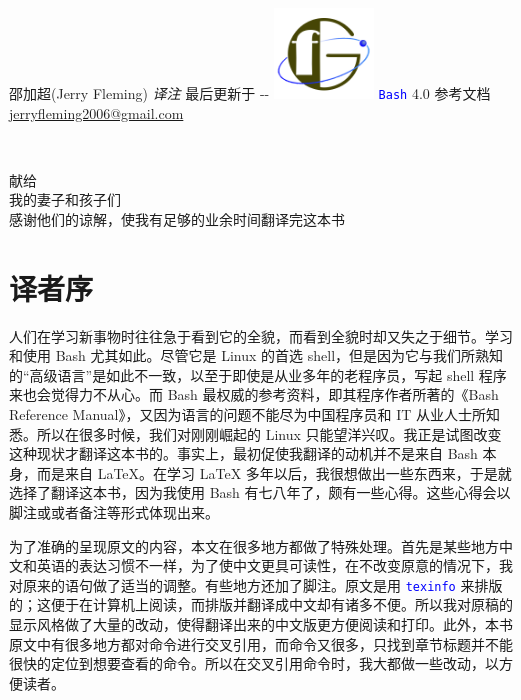 \documentclass[openany,notitlepage]{book}
\renewcommand{\dateseparator}{-}
\renewcommand{\today}{\the\year \dateseparator \twodigit\month \dateseparator \twodigit\day}
\newcommand{\code}[1]{\textcolor{blue}{{\tt #1}}}
\begin{document}
\begin{CJK}{UTF8}{song}
\begin{center}
{\Large 邵加超(Jerry Fleming)}  {\Large\textsl{译注}}
\vskip 10pt
{\Large 最后更新于 \today}
\vfill
\includegraphics[width=100px]{geofuture.png}
\vskip 15pt
{\Large\code{Bash} 4.0 参考文档}\\
\vskip 5pt
\href{mailto:jerryfleming2006@gmail.com}{\Large jerryfleming2006@gmail.com}
\end{center}
\newpage
\begin{center}\ \end{center}
\par
\vskip 80pt
\begin{center}
{\Large 献给}\\
我的妻子和孩子们\\
感谢他们的谅解，使我有足够的业余时间翻译完这本书
\end{center}
\newpage


\setcounter{page}{1}
\pagestyle{myplain}

\renewcommand{\chaptermark}[1]{\markboth{#1}{}}
\renewcommand{\tocetcmark}[1]{\markboth{#1}{}}
\chapter{译者序}\label{test}

人们在学习新事物时往往急于看到它的全貌，而看到全貌时却又失之于细节。学习和使用 Bash 尤其如此。尽管它是 Linux 的首选 shell，但是因为它与我们所熟知的``高级语言''是如此不一致，以至于即使是从业多年的老程序员，写起 shell 程序来也会觉得力不从心。而 Bash 最权威的参考资料，即其程序作者所著的《Bash Reference Manual》，又因为语言的问题不能尽为中国程序员和 IT 从业人士所知悉。所以在很多时候，我们对刚刚崛起的 Linux 只能望洋兴叹。我正是试图改变这种现状才翻译这本书的。事实上，最初促使我翻译的动机并不是来自 Bash 本身，而是来自 \LaTeX{}。在学习 \LaTeX{} 多年以后，我很想做出一些东西来，于是就选择了翻译这本书，因为我使用 Bash 有七八年了，颇有一些心得。这些心得会以脚注或或者备注等形式体现出来。

为了准确的呈现原文的内容，本文在很多地方都做了特殊处理。首先是某些地方中文和英语的表达习惯不一样，为了使中文更具可读性，在不改变原意的情况下，我对原来的语句做了适当的调整。有些地方还加了脚注。原文是用 \code{texinfo} 来排版的；这便于在计算机上阅读，而排版并翻译成中文却有诸多不便。所以我对原稿的显示风格做了大量的改动，使得翻译出来的中文版更方便阅读和打印。此外，本书原文中有很多地方都对命令进行交叉引用，而命令又很多，只找到章节标题并不能很快的定位到想要查看的命令。所以在交叉引用命令时，我大都做一些改动，以方便读者。


\end{CJK}
\end{document}
